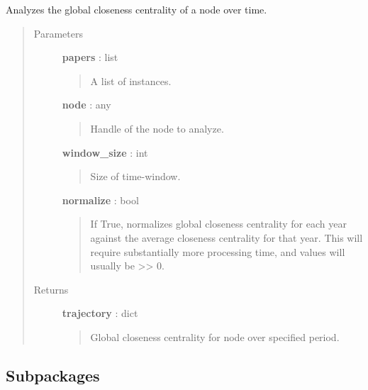 \documentclass[letterpaper,10pt,english]{sphinxmanual}
\begin{document}
\begin{fulllineitems}
\label{tethne:tethne.workflow.closeness_introgression}
Analyzes the global closeness centrality of a node over time.
\begin{quote}\begin{description}
\item[{Parameters }] \leavevmode
\textbf{papers} : list
\begin{quote}

A list of {\hyperref[tethne:tethne.data.Paper]{}} instances.
\end{quote}

\textbf{node} : any
\begin{quote}

Handle of the node to analyze.
\end{quote}

\textbf{window\_size} : int
\begin{quote}

Size of time-window.
\end{quote}

\textbf{normalize} : bool
\begin{quote}

If True, normalizes global closeness centrality for each year against
the average closeness centrality for that year. This will require
substantially more processing time, and values will usually be \textgreater{}\textgreater{} 0.
\end{quote}

\item[{Returns }] \leavevmode
\textbf{trajectory} : dict
\begin{quote}

Global closeness centrality for node over specified period.
\end{quote}

\end{description}\end{quote}

\end{fulllineitems}



\subsection{Subpackages}
\label{tethne:subpackages}
\end{document}
